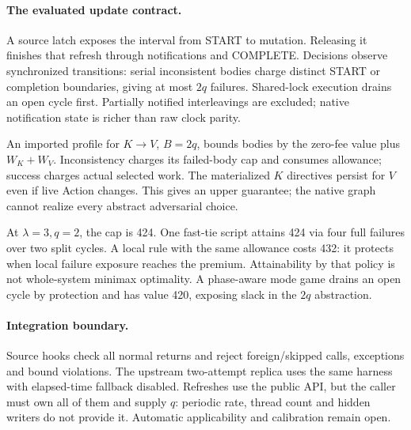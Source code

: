 \paragraph{The evaluated update contract.}
A source latch exposes the interval from START to mutation. Releasing it finishes that refresh through notifications and COMPLETE. Decisions observe synchronized transitions: serial inconsistent bodies charge distinct START or completion boundaries, giving at most $2q$ failures. Shared-lock execution drains an open cycle first. Partially notified interleavings are excluded; native notification state is richer than raw clock parity.

An imported profile for $K\to V$, $B=2q$, bounds bodies by the zero-fee value plus $W_K+W_V$. Inconsistency charges its failed-body cap and consumes allowance; success charges actual selected work. The materialized $K$ directives persist for $V$ even if live Action changes. This gives an upper guarantee; the native graph cannot realize every abstract adversarial choice.

At $\lambda=3,q=2$, the cap is 424. One fast-tie script attains 424 via four full failures over two split cycles. A local rule with the same allowance costs 432: it protects when local failure exposure reaches the premium. Attainability by that policy is not whole-system minimax optimality. A phase-aware mode game drains an open cycle by protection and has value 420, exposing slack in the $2q$ abstraction.

\paragraph{Integration boundary.}
Source hooks check all normal returns and reject foreign/skipped calls, exceptions and bound violations. The upstream two-attempt replica uses the same harness with elapsed-time fallback disabled. Refreshes use the public API, but the caller must own all of them and supply $q$: periodic rate, thread count and hidden writers do not provide it. Automatic applicability and calibration remain open.

